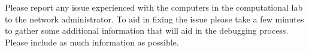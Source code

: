 \documentclass{../../../assets/LabArx-Dev} 	%
\begin{document}


\maketitle
\fancyfoot{}
 
Please report any issue experienced with the computers in the computational lab to the network administrator. To aid in fixing the issue please take a few minutes to gather some additional information that will aid in the debugging process. Please include as much information as possible.
\end{document}
